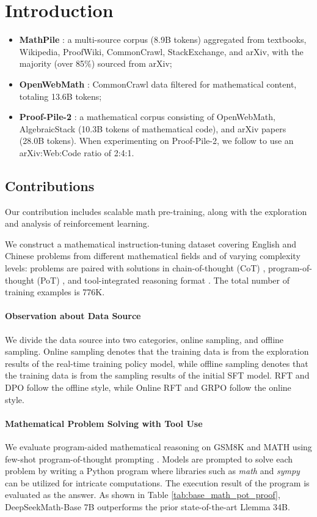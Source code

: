 \section{Introduction}

\begin{itemize}[topsep=0pt]
    \item \textbf{MathPile} \citep{mathpile}: a multi-source corpus (8.9B tokens) aggregated from textbooks, Wikipedia, ProofWiki, CommonCrawl, StackExchange, and arXiv, with the majority (over 85\%) sourced from arXiv;
    \item \textbf{OpenWebMath} \citep{openwebmath}: CommonCrawl data filtered for mathematical content, totaling 13.6B tokens;
    \item \textbf{Proof-Pile-2} \citep{llemma}: a mathematical corpus consisting of OpenWebMath, AlgebraicStack (10.3B tokens of mathematical code), and arXiv papers (28.0B tokens). When experimenting on Proof-Pile-2, we follow \cite{llemma} to use an arXiv:Web:Code ratio of 2:4:1.
\end{itemize}

\subsection{Contributions}
Our contribution includes scalable math pre-training, along with the exploration and analysis of reinforcement learning.

We construct a mathematical instruction-tuning dataset covering English and Chinese problems from different mathematical fields and of varying complexity levels: problems are paired with solutions in chain-of-thought (CoT) \citep{cot}, program-of-thought (PoT) \citep{pot,pal}, and tool-integrated reasoning format \citep{tora}. The total number of training examples is 776K.

\paragraph{Observation about Data Source} We divide the data source into two categories, online sampling, and offline sampling. Online sampling denotes that the training data is from the exploration results of the real-time training policy model, while offline sampling denotes that the training data is from the sampling results of the initial SFT model. RFT and DPO follow the offline style, while Online RFT and GRPO follow the online style. 

\paragraph{Mathematical Problem Solving with Tool Use} We evaluate program-aided mathematical reasoning on GSM8K and MATH using few-shot program-of-thought prompting \citep{pot,pal}. Models are prompted to solve each problem by writing a Python program where libraries such as \textit{math} and \textit{sympy} can be utilized for intricate computations. The execution result of the program is evaluated as the answer. As shown in Table \ref{tab:base_math_pot_proof}, DeepSeekMath-Base 7B outperforms the prior state-of-the-art Llemma 34B.

